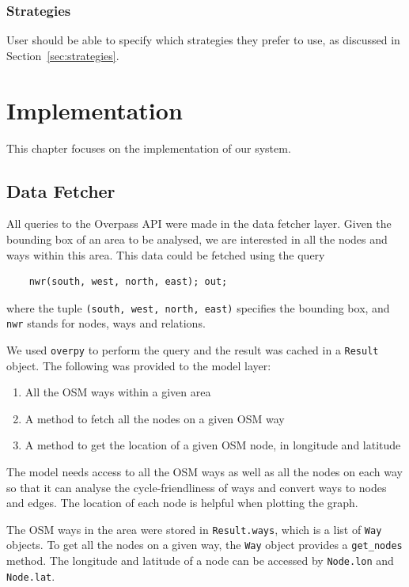 \documentclass[12pt,a4paper]{report}
\begin{document}
\subsection{Strategies}
User should be able to specify which strategies they prefer to use, as discussed in Section~\ref{sec:strategies}.

\chapter{Implementation}\label{chapter:impl}
This chapter focuses on the implementation of our system.

\section{Data Fetcher}
All queries to the Overpass API were made in the data fetcher layer. Given the bounding box of an area to be analysed, we are interested in all the nodes and ways within this area. This data could be fetched using the query
\begin{verbatim}
    nwr(south, west, north, east); out;
\end{verbatim}
where the tuple \texttt{(south, west, north, east)} specifies the bounding box, and \texttt{nwr} stands for nodes, ways and relations.

We used \texttt{overpy} to perform the query and the result was cached in a \texttt{Result} object. The following was provided to the model layer:
\begin{enumerate}
    \item All the OSM ways within a given area
    \item A method to fetch all the nodes on a given OSM way
    \item A method to get the location of a given OSM node, in longitude and latitude
\end{enumerate}

The model needs access to all the OSM ways as well as all the nodes on each way so that it can analyse the cycle-friendliness of ways and convert ways to nodes and edges. The location of each node is helpful when plotting the graph.

The OSM ways in the area were stored in \texttt{Result.ways}, which is a list of \texttt{Way} objects. To get all the nodes on a given way, the \texttt{Way} object provides a \texttt{get\_nodes} method. The longitude and latitude of a node can be accessed by \texttt{Node.lon} and \texttt{Node.lat}.
\end{document}

